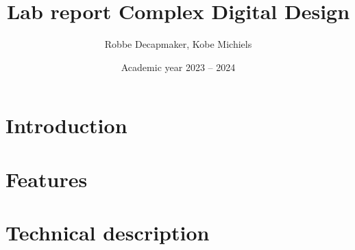 \documentclass[a4paper,kul]{kulakarticle} %
\date{Academic year 2023 -- 2024}
\title{Lab report Complex Digital Design}
\author{Robbe Decapmaker, Kobe Michiels}
\begin{document}
\maketitle
\section{Introduction}

\section{Features}


\section{Technical description}

\end{document}
